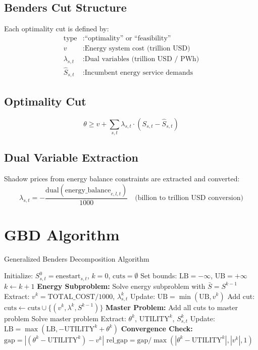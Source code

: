 \documentclass[11pt]{article}
\begin{document}
\subsection{Benders Cut Structure}
Each optimality cut is defined by:
\begin{align}
\text{type} &: \text{``optimality'' or ``feasibility''} \\
v &: \text{Energy system cost (trillion USD)} \\
\lambda_{s,t} &: \text{Dual variables (trillion USD / PWh)} \\
\hat{S}_{s,t} &: \text{Incumbent energy service demands}
\end{align}

\subsection{Optimality Cut}
\begin{equation}
\theta \geq v + \sum_{s,t} \lambda_{s,t} \cdot (S_{s,t} - \hat{S}_{s,t})
\end{equation}

\subsection{Dual Variable Extraction}
Shadow prices from energy balance constraints are extracted and converted:
\begin{equation}
\lambda_{s,t} = -\frac{\text{dual}(\text{energy\_balance}_{e,l,t})}{1000} \quad \text{(billion to trillion USD conversion)}
\end{equation}

\section{GBD Algorithm}

\begin{algorithm}
\caption{Generalized Benders Decomposition Algorithm}
\begin{algorithmic}[1]
\STATE Initialize: $S^0_{s,t} = \text{enestart}_{s,t}$, $k = 0$, $\text{cuts} = \emptyset$
\STATE Set bounds: $\text{LB} = -\infty$, $\text{UB} = +\infty$
    \STATE $k \leftarrow k + 1$
    \STATE \textbf{Energy Subproblem:}
    \STATE \quad Solve energy subproblem with $\bar{S} = S^{k-1}$
    \STATE \quad Extract: $v^k = \text{TOTAL\_COST} / 1000$, $\lambda^k_{s,t}$
    \STATE \quad Update: $\text{UB} = \min(\text{UB}, v^k)$
    \STATE \quad Add cut: $\text{cuts} \leftarrow \text{cuts} \cup \{(v^k, \lambda^k, S^{k-1})\}$
    \STATE \textbf{Master Problem:}
    \STATE \quad Add all cuts to master problem
    \STATE \quad Solve master problem
    \STATE \quad Extract: $\theta^k$, $\text{UTILITY}^k$, $S^k_{s,t}$
    \STATE \quad Update: $\text{LB} = \max(\text{LB}, -\text{UTILITY}^k + \theta^k)$
    \STATE \textbf{Convergence Check:}
    \STATE \quad $\text{gap} = |(\theta^k - \text{UTILITY}^k) - v^k|$
    \STATE \quad $\text{rel\_gap} = \text{gap} / \max(|\theta^k - \text{UTILITY}^k|, |v^k|, 1)$
\ENDWHILE
\end{algorithmic}
\end{algorithm}
\end{document}
